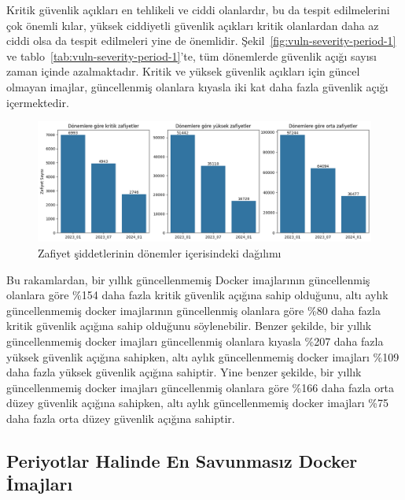 Kritik güvenlik açıkları en tehlikeli ve ciddi olanlardır, bu da tespit edilmelerini çok önemli kılar, yüksek ciddiyetli güvenlik açıkları kritik olanlardan daha az ciddi olsa da tespit edilmeleri yine de önemlidir. Şekil~\ref{fig:vuln-severity-period-1} ve tablo~\ref{tab:vuln-severity-period-1}'te, tüm dönemlerde güvenlik açığı sayısı zaman içinde azalmaktadır. Kritik ve yüksek güvenlik açıkları için güncel olmayan imajlar, güncellenmiş olanlara kıyasla iki kat daha fazla güvenlik açığı içermektedir.

\begin{figure}
    \centering
    \includegraphics[width=1\linewidth]{images/s2/severity-over-periods.png}
    \caption{Zafiyet şiddetlerinin dönemler içerisindeki dağılımı}\label{fig:severity-over-periods}
\end{figure}

Bu rakamlardan, bir yıllık güncellenmemiş Docker imajlarının güncellenmiş olanlara göre \%154 daha fazla kritik güvenlik açığına sahip olduğunu, altı aylık güncellenmemiş docker imajlarının güncellenmiş olanlara göre \%80 daha fazla kritik güvenlik açığına sahip olduğunu söylenebilir. Benzer şekilde, bir yıllık güncellenmemiş docker imajları güncellenmiş olanlara kıyasla \%207 daha fazla yüksek güvenlik açığına sahipken, altı aylık güncellenmemiş docker imajları \%109 daha fazla yüksek güvenlik açığına sahiptir. Yine benzer şekilde, bir yıllık güncellenmemiş docker imajları güncellenmiş olanlara göre \%166 daha fazla orta düzey güvenlik açığına sahipken, altı aylık güncellenmemiş docker imajları \%75 daha fazla orta düzey güvenlik açığına sahiptir.


\subsection{Periyotlar Halinde En Savunmasız Docker İmajları}\label{subsec:most-vuln-images-in-periods}

